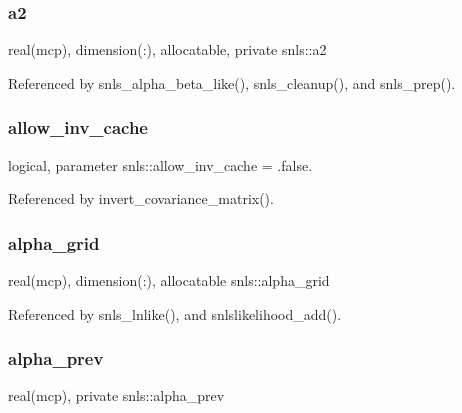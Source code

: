 \subsubsection{\texorpdfstring{a2}{a2}}
{\footnotesize\ttfamily real(mcp), dimension(\+:), allocatable, private snls\+::a2\hspace{0.3cm}{\ttfamily [private]}}



Referenced by snls\+\_\+alpha\+\_\+beta\+\_\+like(), snls\+\_\+cleanup(), and snls\+\_\+prep().

\mbox{\label{namespacesnls_a8df88425e6d587341a52687ef62d81ae}} 
\subsubsection{\texorpdfstring{allow\+\_\+inv\+\_\+cache}{allow\_inv\_cache}}
{\footnotesize\ttfamily logical, parameter snls\+::allow\+\_\+inv\+\_\+cache = .false.\hspace{0.3cm}{\ttfamily [private]}}



Referenced by invert\+\_\+covariance\+\_\+matrix().

\mbox{\label{namespacesnls_ac4adeb5ed9cc6b1ff8d81eb5c3f7614f}} 
\subsubsection{\texorpdfstring{alpha\+\_\+grid}{alpha\_grid}}
{\footnotesize\ttfamily real(mcp), dimension(\+:), allocatable snls\+::alpha\+\_\+grid\hspace{0.3cm}{\ttfamily [private]}}



Referenced by snls\+\_\+lnlike(), and snlslikelihood\+\_\+add().

\mbox{\label{namespacesnls_a0037badcbc89a4f561b14d59f08c7d48}} 
\subsubsection{\texorpdfstring{alpha\+\_\+prev}{alpha\_prev}}
{\footnotesize\ttfamily real(mcp), private snls\+::alpha\+\_\+prev\hspace{0.3cm}{\ttfamily [private]}}



